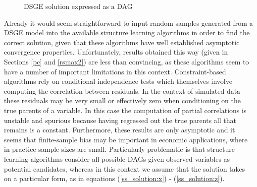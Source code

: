 \documentclass{article}
\begin{document}
\begin{figure}
  \centering
  \caption{DSGE solution expressed as a DAG}
  \label{dsge_dag}
\end{figure}

Already it would seem straightforward to input random samples generated from a DSGE model into the available structure learning algorithms in order to find the correct solution, given that these algorithms have well established asymptotic convergence properties. Unfortunately, results obtained this way (given in Sections \ref{pc} and \ref{rsmax2}) are less than convincing, as these algorithms seem to have a number of important limitations in this context. Constraint-based algorithms rely on conditional independence tests which themselves involve computing the correlation between residuals. In the context of simulated data these residuals may be very small or effectively zero when conditioning on the true parents of a variable. In this case the computation of partial correlations is unstable and spurious because having regressed out the true parents all that remains is a constant. Furthermore, these results are only asymptotic and it seems that finite-sample bias may be important in economic applications, where in practice sample sizes are small. Particularly problematic is that structure learning algorithms consider all possible DAGs given observed variables as potential candidates, whereas in this context we assume that the solution takes on a particular form, as in equations (\ref{ss_solution:x}) - (\ref{ss_solution:z}).
\end{document}
